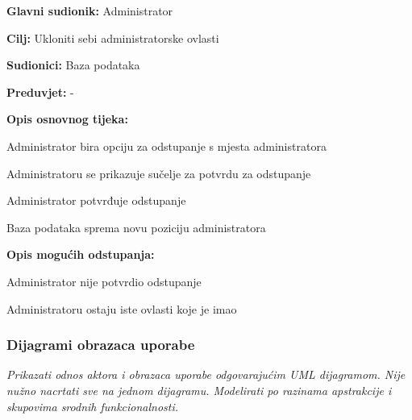 \noindent {}
\begin{packed_item}

\item \textbf{Glavni sudionik:} Administrator
\item  \textbf{Cilj:} Ukloniti sebi administratorske ovlasti
\item  \textbf{Sudionici:} Baza podataka
\item  \textbf{Preduvjet:} -
\item  \textbf{Opis osnovnog tijeka:}

\item[] \begin{packed_enum}

    \item Administrator bira opciju za odstupanje s mjesta administratora
    \item Administratoru se prikazuje sučelje za potvrdu za odstupanje
    \item Administrator potvrđuje odstupanje
    \item Baza podataka sprema novu poziciju administratora

\end{packed_enum}

\item  \textbf{Opis mogućih odstupanja:}

\item[] \begin{packed_item}

    \item[3.a] Administrator nije potvrdio odstupanje
    \item[] \begin{packed_enum}

        \item Administratoru ostaju iste ovlasti koje je imao

    \end{packed_enum}

\end{packed_item}
\end{packed_item}

\subsubsection{Dijagrami obrazaca uporabe}

\textit{Prikazati odnos aktora i obrazaca uporabe odgovarajućim UML dijagramom. Nije nužno nacrtati sve na jednom dijagramu. Modelirati po razinama apstrakcije i skupovima srodnih funkcionalnosti.}
\eject		

